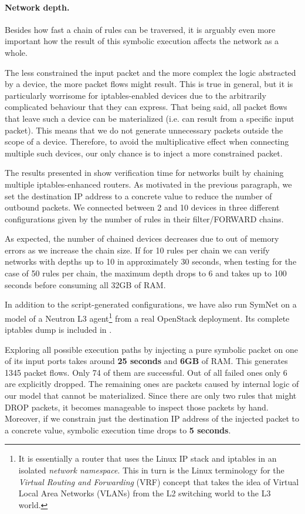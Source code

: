 \paragraph{Network depth.}  Besides how fast a chain of rules can be traversed,
it is arguably even more important how the result of this symbolic execution
affects the network as a whole.

The less constrained the input packet and the more complex the logic abstracted
by a device, the more packet flows might result.  This is true in general, but
it is particularly worrisome for iptables-enabled devices due to the
arbitrarily complicated behaviour that they can express.  That being said, all
packet flows that leave such a device can be materialized (i.e. can result from
a specific input packet).  This means that we do not generate unnecessary
packets outside the scope of a device.  Therefore, to avoid the multiplicative
effect when connecting multiple such devices, our only chance is to inject a
more constrained packet.

The results presented in  show
verification time for networks built by chaining multiple iptables-enhanced
routers.  As motivated in the previous paragraph, we set the destination IP
address to a concrete value to reduce the number of outbound packets.  We
connected between 2 and 10 devices in three different configurations given by
the number of rules in their filter/FORWARD chains.

As expected, the number of chained devices decreases due to out of memory
errors as we increase the chain size.  If for 10 rules per chain we can verify
networks with depths up to 10 in approximately 30 seconds, when testing for the
case of 50 rules per chain, the maximum depth drops to 6 and takes up to 100
seconds before consuming all 32GB of RAM.

\bigskip

In addition to the script-generated configurations, we have also run SymNet on
a model of a Neutron L3 agent\footnote{It is essentially a router that uses the
Linux IP stack and iptables in an isolated \emph{network namespace}.  This in
turn is the Linux terminology for the \emph{Virtual Routing and Forwarding}
(VRF) concept that takes the idea
of Virtual Local Area Networks (VLANs)
from the L2 switching world to the L3 world.} from a real OpenStack deployment.
Its complete iptables dump is included in
.

Exploring all possible execution paths by injecting a pure symbolic packet on
one of its input ports takes around \textbf{25 seconds} and \textbf{6GB} of
RAM.  This generates 1345 packet flows.  Only 74 of them are successful.  Out
of all failed ones only 6 are explicitly dropped.  The remaining ones are
packets caused by internal logic of our model that cannot be materialized.
Since there are only two rules that might DROP packets, it becomes manageable
to inspect those packets by hand.  Moreover, if we constrain just the
destination IP address of the injected packet to a concrete value, symbolic
execution time drops to \textbf{5 seconds}.
